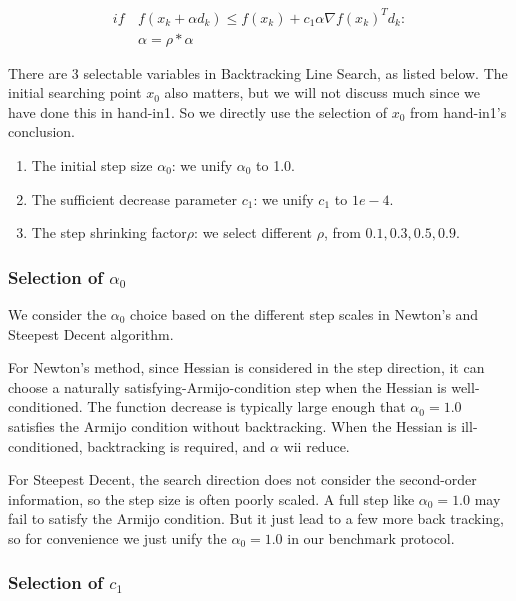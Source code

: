 \documentclass[12pt]{article}
\begin{document}
\begin{equation}
\begin{aligned}
if \, & f(x_k + \alpha d_k) \leq f(x_k) + c_1 \alpha \nabla f(x_k)^T d_k:\\
& \alpha = \rho * \alpha
\end{aligned}
\end{equation}

There are 3 selectable variables in Backtracking Line Search, as listed below. The initial searching point $x_0$ also matters, but we will not discuss much since we have done this in hand-in1. So we directly use the selection of $x_0$ from hand-in1's conclusion.

\begin{enumerate}
  \item The initial step size $\alpha_0$: we unify $\alpha_0$ to 1.0.
  \item The sufficient decrease parameter $c_1$: we unify $c_1$ to $1e-4$.
  \item The step shrinking factor$\rho$: we select different $\rho$, from ${0.1,0.3,0.5,0.9}$.
\end{enumerate}

\subsubsection{Selection of $\alpha_0$}
We consider the $\alpha_0$ choice based on the different step scales in Newton's and Steepest Decent algorithm.

For Newton's method, since Hessian is considered in the step direction, it can choose a naturally satisfying-Armijo-condition step when the Hessian is well-conditioned. The function decrease is typically large enough that $\alpha_0=1.0$ satisfies the Armijo condition without backtracking. When the Hessian is ill-conditioned, backtracking is required, and $\alpha$ wii reduce.

For Steepest Decent, the search direction does not consider the second-order information, so the step size is often poorly scaled. A full step like $\alpha_0=1.0$ may fail to satisfy the Armijo condition. But it just lead to a few more back tracking, so for convenience we just unify the $\alpha_0=1.0$ in our benchmark protocol.

\subsubsection{Selection of $c_1$}
\end{document}
